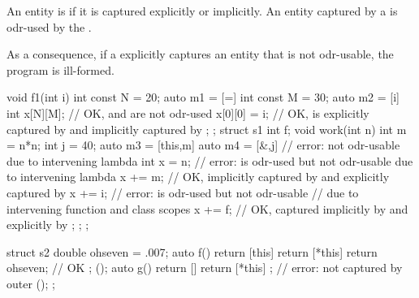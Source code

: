 \pnum
An entity is  if it is captured explicitly or implicitly. An entity
captured by a  is odr-used by
the .
\begin{note}
As a consequence, if a 
explicitly captures an entity that is not odr-usable,
the program is ill-formed.
\end{note}
\begin{example}
%
\begin{codeblock}
void f1(int i) {
  int const N = 20;
  auto m1 = [=]{
    int const M = 30;
    auto m2 = [i]{
      int x[N][M];              // OK,  and  are not odr-used
      x[0][0] = i;              // OK,  is explicitly captured by  and implicitly captured by 
    };
  };
  struct s1 {
    int f;
    void work(int n) {
      int m = n*n;
      int j = 40;
      auto m3 = [this,m] {
        auto m4 = [&,j] {       // error:  not odr-usable due to intervening lambda 
          int x = n;            // error:  is odr-used but not odr-usable due to intervening lambda 
          x += m;               // OK,  implicitly captured by  and explicitly captured by 
          x += i;               // error:  is odr-used but not odr-usable
                                // due to intervening function and class scopes
          x += f;               // OK,  captured implicitly by  and explicitly by 
        };
      };
    }
  };
}

struct s2 {
  double ohseven = .007;
  auto f() {
    return [this] {
      return [*this] {
          return ohseven;       // OK
      };
    }();
  }
  auto g() {
    return [] {
      return [*this] { };       // error:  not captured by outer 
    }();
  }
};
\end{codeblock}
\end{example}

